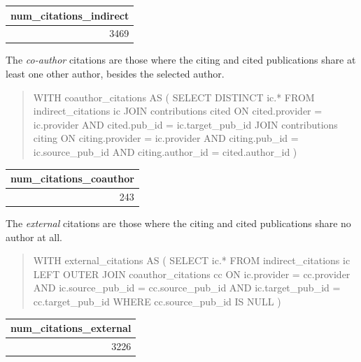 \begin{center}
    \begin{tabular}{|r|}
        \hline
        num\_citations\_indirect \\
        \hline\hline
        3469 \\
        \hline
    \end{tabular}
\end{center}

The \emph{co-author} citations are those where the citing and cited publications share at least one other author, besides the selected author.

\begin{quote}
    \begin{vercode}
WITH coauthor_citations AS (
    SELECT DISTINCT ic.*
    FROM indirect_citations ic
        JOIN contributions cited
            ON cited.provider = ic.provider
                AND cited.pub_id = ic.target_pub_id
        JOIN contributions citing
            ON citing.provider = ic.provider
                AND citing.pub_id = ic.source_pub_id
                AND citing.author_id = cited.author_id
)
    \end{vercode}
\end{quote}

\begin{center}
    \begin{tabular}{|r|}
        \hline
        num\_citations\_coauthor \\
        \hline\hline
        243 \\
        \hline
    \end{tabular}
\end{center}

The \emph{external} citations are those where the citing and cited publications share no author at all.

\begin{quote}
    \begin{vercode}
WITH external_citations AS (
    SELECT ic.*
    FROM indirect_citations ic
        LEFT OUTER JOIN coauthor_citations cc
            ON ic.provider = cc.provider
                AND ic.source_pub_id = cc.source_pub_id
                AND ic.target_pub_id = cc.target_pub_id
    WHERE cc.source_pub_id IS NULL
)
    \end{vercode}
\end{quote}

\begin{center}
    \begin{tabular}{|r|}
        \hline
        num\_citations\_external \\
        \hline\hline
        3226 \\
        \hline
    \end{tabular}
\end{center}

